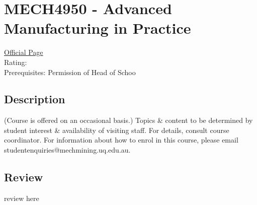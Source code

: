 \hypertarget{MECH4950}{\section{MECH4950 - Advanced Manufacturing in Practice}}

\large
\textcolor{turbo_purple}{\href{https://my.uq.edu.au/programs-courses/course.html?course_code=MECH4950}{Official Page}} \\
Rating: \cstar\cstar\cstar\cstar\ostar \\
Prerequisites: Permission of Head of Schoo

\normalsize
\subsection*{Description}
(Course is offered on an occasional basis.) Topics \& content to be determined by student interest \& availability of visiting staff.
For details, consult course coordinator.
For information about how to enrol in this course, please email studentenquiries@mechmining.uq.edu.au.

\subsection*{Review}
review here
